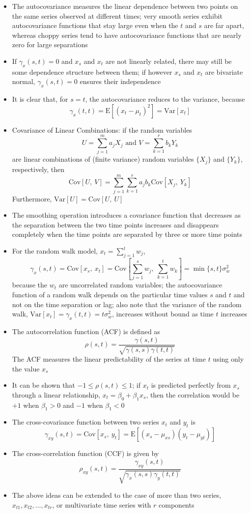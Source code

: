 \documentclass[12pt]{article}
\newcommand{\expe}[1]{\text{E}\left[ #1 \right]}
\renewcommand{\var}[1]{\text{Var}\left[ #1 \right]}
\newcommand{\cov}[2]{\text{Cov}\left[#1, ~#2\right]}
\begin{document}
\begin{itemize}
\item The autocovariance measures the linear dependence between two points on the same series observed at different times; very smooth series exhibit autocovariance functions that stay large even when the $t$ and $s$ are far apart, whereas choppy series tend to have autocovariance functions that are nearly zero for large separations 
\item If $\gamma_x(s,t) = 0$ and $x_s$ and $x_t$ are not linearly related, there may still be some dependence structure between them; if however $x_s$ and $x_t$ are bivariate normal, $\gamma_x(s,t) = 0$ ensures their independence 
\item It is clear that, for $s=t$, the autocovariance reduces to the variance, because $$ \gamma_x(t,t) = \expe{(x_t - \mu_t)^2} = \var{x_t} $$ 
\item Covariance of Linear Combinations: if the random variables $$ U = \sum_{j=1}^m a_jX_j \text{ and } V = \sum_{k=1}^r b_kY_k $$ are linear combinations of (finite variance) random variables $\{X_j\}$ and $\{Y_k\}$, respectively, then $$ \cov{U}{V} = \sum_{j=1}^m\sum_{k=1}^r a_jb_k\cov{X_j}{Y_k} $$ Furthermore, $\var{U} = \cov{U}{U}$
\item The smoothing operation introduces a covariance function that decreases as the separation between the two time points increases and disappears completely when the time points are separated by three or more time points
\item For the random walk model, $x_t = \sum_{j=1}^t w_j$, $$ \gamma_x(s,t) = \cov{x_s}{x_t} = \cov{\sum_{j=1}^s w_j}{\sum_{k=1}^t w_k} = \min\{s,t\} \sigma^2_w $$ because the $w_t$ are uncorrelated random variables; the autocovariance function of a random walk depends on the particular time values $s$ and $t$ and not on the time separation or lag; also note that the variance of the random walk, $\var{x_t} = \gamma_x(t,t) = t\sigma^2_w$, increases without bound as time $t$ increases  
\item The autocorrelation function (ACF) is defined as $$ \rho(s,t) = \frac{\gamma(s,t)}{\sqrt{\gamma(s,s)\gamma(t,t)}} $$ The ACF measures the linear predictability of the series at time $t$ using only the value $x_s$ 
\item It can be shown that $-1 \leq \rho(s,t) \leq 1$; if $x_t$ is predicted perfectly from $x_s$ through a linear relationship, $x_t = \beta_0 + \beta_1x_s$, then the correlation would be $+1$ when $\beta_1 > 0$ and $-1$ when $\beta_1 < 0$ 
\item The cross-covariance function between two series $x_t$ and $y_t$ is $$ \gamma_{xy}(s,t) = \cov{x_s}{y_t} = \expe{(x_s - \mu_{xs})(y_t - \mu_{yt})} $$ 
\item The cross-correlation function (CCF) is given by $$ \rho_{xy}(s,t) = \frac{\gamma_{xy}(s,t)}{\sqrt{\gamma_x(s,s)\gamma_y(t,t)}} $$ 
\item The above ideas can be extended to the case of more than two series, $x_{t1},x_{t2},\dots,x_{tr}$, or multivariate time series with $r$ components
\end{itemize}
\end{document}
